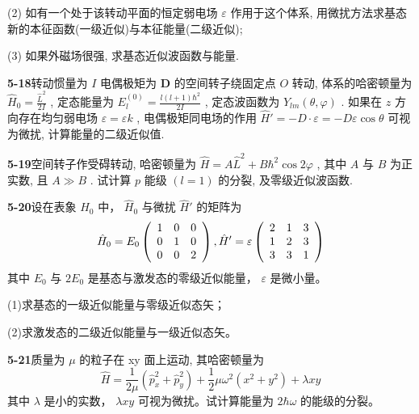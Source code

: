 (2) 如有一个处于该转动平面的恒定弱电场 $\varepsilon$ 作用于这个体系, 用微扰方法求基态新的本征函数(一级近似)与本征能量(二级近似); 

(3) 如果外磁场很强, 求基态近似波函数与能量.

\vfill

\newpage
\vfill

\noindent
\textbf{5-18}\quad 转动惯量为 $I$ 电偶极矩为 $\pmb{D}$ 的空间转子绕固定点 $O$ 转动, 体系的哈密顿量为 $\hat{H}_0 = \frac{\hat{L}^2}{2I}$ , 定态能量为 $E_l^{(0)} = \frac{l(l + 1)\hbar^2}{2I}$ , 定态波函数为 $Y_{lm}(\theta, \varphi)$ . 如果在 $z$ 方向存在均匀弱电场 $\varepsilon = \varepsilon k$ , 电偶极矩同电场的作用 $\hat{H}' = -D \cdot \varepsilon = -D\varepsilon \cos \theta$ 可视为微扰, 计算能量的二级近似值.

\vfill

\newpage
\vfill

\noindent
\textbf{5-19}\quad 空间转子作受碍转动, 哈密顿量为 $\hat{H} = A\hat{L}^2 + B\hbar^2\cos 2\varphi$ , 其中 $A$ 与 $B$ 为正实数, 且 $A \gg B$ . 试计算 $p$ 能级 $(l = 1)$ 的分裂, 及零级近似波函数.

\vfill

\newpage
\vfill

\noindent
\textbf{5-20}\quad 设在表象 $\hat{H}_0$ 中， $\hat{H}_0$ 与微扰 $\hat{H}'$ 的矩阵为
$$
\hat {H} _ {0} = E _ {0} \left( \begin{array}{c c c} 1 & 0 & 0 \\ 0 & 1 & 0 \\ 0 & 0 & 2 \end{array} \right), \hat {H} ^ {\prime} = \varepsilon \left( \begin{array}{c c c} 2 & 1 & 3 \\ 1 & 2 & 3 \\ 3 & 3 & 1 \end{array} \right)
$$
其中 $E_0$ 与 $2E_0$ 是基态与激发态的零级近似能量， $\varepsilon$ 是微小量。

(1)求基态的一级近似能量与零级近似态矢；

(2)求激发态的二级近似能量与一级近似态矢。

\vfill

\newpage
\vfill

\noindent
\textbf{5-21}\quad 质量为 $\mu$ 的粒子在 xy 面上运动, 其哈密顿量为
$$
\hat {H} = \frac {1}{2 \mu} (\hat {p} _ {x} ^ {2} + \hat {p} _ {y} ^ {2}) + \frac {1}{2} \mu \omega^ {2} (x ^ {2} + y ^ {2}) + \lambda x y
$$
其中 $\lambda$ 是小的实数， $\lambda xy$ 可视为微扰。试计算能量为 $2\hbar\omega$ 的能级的分裂。

